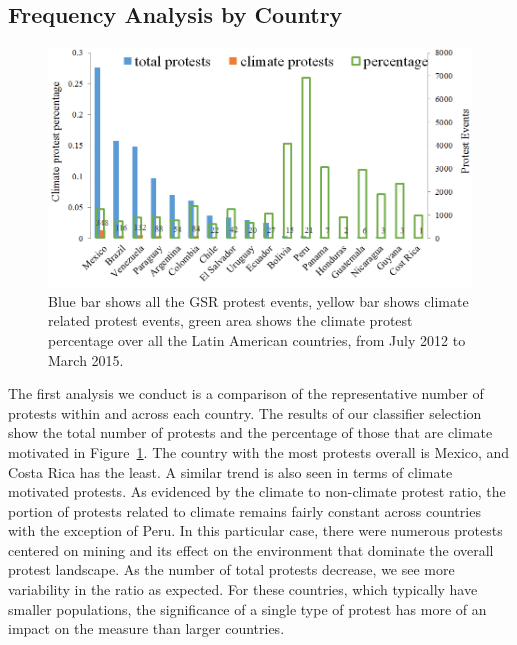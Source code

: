 \documentclass[9pt,twocolumn,twoside]{pnas-new}
\begin{document}
\subsection{Frequency Analysis by Country}

\begin{figure}[htb]
\centerline
{\includegraphics[width=.48\textwidth]{figures/month-country-protest3}}
\caption{Blue bar shows all the GSR protest events, yellow bar shows climate related protest events, green area shows the climate protest percentage over all the Latin American countries, from July 2012 to March 2015.}
\label{month_percentage}
\end{figure}

The first analysis we conduct is a comparison of the representative number of protests within and across each country.
The results of our classifier selection show the total number of protests and the percentage of those that are climate motivated in Figure~\ref{month_percentage}.
The country with the most protests overall is Mexico, and Costa Rica has the least.
A similar trend is also seen in terms of climate motivated protests.
As evidenced by the climate to non-climate protest ratio, the portion of protests related to climate remains fairly constant across countries with the exception of Peru.
In this particular case, there were numerous protests centered on mining and its effect on the environment that dominate the overall protest landscape.
As the number of total protests decrease, we see more variability in the ratio as expected.
For these countries, which typically have smaller populations, the significance of a single type of protest has more of an impact on the measure than larger countries.

\end{document}
